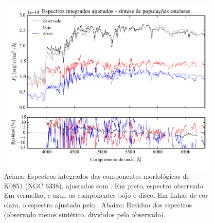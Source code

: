 \begin{figure}
	\includegraphics[page=13,width=\textwidth]{figuras/sample006a_synthesis}
	\caption[Espectros ajustados com \starlight das componentes morfológicas de
	K0851 (NGC 6338)]
	{Acima: Espectros integrados das componentes morfológicas de
	K0851 (NGC 6338), ajustados com \starlight. Em preto, espectro observado. Em
	vermelho, e azul, as componentes bojo e disco. Em linhas de cor clara, o
	espectro ajustado pelo \starlight. Abaixo: Resíduo dos espectros (observado
	menos sintético, divididos pelo observado).}
	\label{fig:decompSintese:K0851}
\end{figure}

